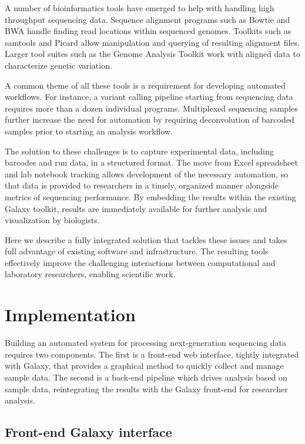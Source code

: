 \documentclass[10pt]{bmc_article}
\newenvironment{bmcformat}{\begin{raggedright}\baselineskip20pt\sloppy\setboolean{publ}{false}}{\end{raggedright}\baselineskip20pt\sloppy}
\begin{document}
\begin{bmcformat}
A number of bioinformatics tools have emerged to help with handling
high throughput sequencing data. Sequence alignment programs such as
Bowtie \cite{langmead_ultrafast_2009} and BWA \cite{li_fast_2009}
handle finding read locations within sequenced genomes. Toolkits such
as samtools \cite{li_sequence_2009} and Picard \cite{_picard_????}
allow manipulation and querying of resulting alignment files. Larger
tool suites such as the Genome Analysis Toolkit
\cite{mckenna_genome_2010} work with aligned data to characterize
genetic variation.

A common theme of all these tools is a requirement for developing
automated workflows. For instance, a variant calling pipeline starting
from sequencing data requires more than a dozen individual
programs. Multiplexed sequencing samples further increase the need for
automation by requiring deconvolution of barcoded samples prior to
starting an analysis workflow.

The solution to these challenges is to capture experimental data,
including barcodes and run data, in a structured format. The move from
Excel spreadsheet and lab notebook tracking allows development of the
necessary automation, so that data is provided to researchers in a
timely, organized manner alongside metrics of sequencing performance.
By embedding the results within the existing Galaxy toolkit, results
are immediately available for further analysis and visualization by
biologists.

Here we describe a fully integrated solution that tackles these
issues and takes full advantage of existing software and
infrastructure. The resulting tools effectively improve the
challenging interactions between computational and laboratory
researchers, enabling scientific work.

\section*{Implementation}

Building an automated system for processing next-generation sequencing
data requires two components. The first is a front-end web interface,
tightly integrated with Galaxy, that provides a graphical method to
quickly collect and manage sample data. The second is a back-end
pipeline which drives analysis based on sample data, reintegrating
the results with the Galaxy front-end for researcher analysis.

\subsection*{Front-end Galaxy interface}


\end{bmcformat}
\end{document}
